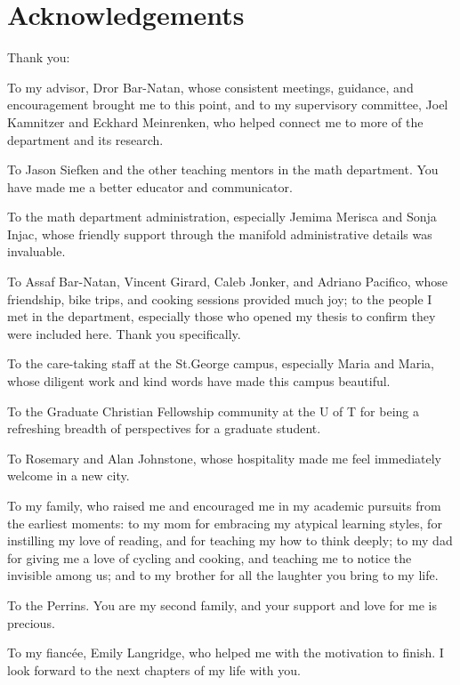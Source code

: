 
\begingroup
\let\clearpage\relax
\let\cleardoublepage\relax

\chapter*{Acknowledgements}

Thank you:

To my advisor, Dror Bar-Natan, whose consistent meetings, guidance,
and encouragement brought me to this point, and to my supervisory committee,
Joel Kamnitzer and Eckhard Meinrenken, who helped connect me to more of the
department and its research.

To Jason Siefken and the other teaching mentors in the math
department. You have made me a better educator and communicator.

To the math department administration, especially Jemima Merisca and Sonja
Injac, whose friendly support through the manifold administrative details was
invaluable.

To Assaf Bar-Natan, Vincent Girard, Caleb Jonker, and Adriano
Pacifico, whose friendship, bike trips, and cooking sessions provided much joy;
to the people I met in the department, especially those who opened
my thesis to confirm they were included here. Thank you specifically.

To the care-taking staff at the St.\@ George campus, especially Maria
and Maria, whose diligent work and kind words have made this campus beautiful.

To the Graduate Christian Fellowship community at the U of T for
being a refreshing breadth of perspectives for a graduate student.

To Rosemary and Alan Johnstone, whose hospitality made me feel
immediately welcome in a new city.

To my family, who raised me and encouraged me in my academic pursuits from the
earliest moments: to my mom for embracing my atypical learning styles, for instilling
my love of reading, and for teaching my how to think deeply; to my dad for
giving me a love of cycling and cooking, and teaching me to notice the invisible
among us; and to my brother for all the laughter you bring to my life.

To the Perrins. You are my second family, and your support and love
for me is precious.

To my fiancée, Emily Langridge, who helped me with the motivation to
finish. I look forward to the next chapters of my life with you.

\endgroup
